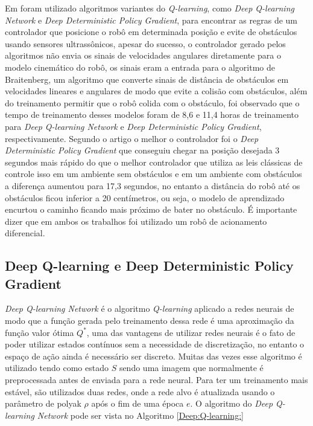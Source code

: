 Em \cite{quiroga2022position}
foram utilizado algoritmos variantes do \textit{Q-learning},
como \textit{Deep Q-learning Network} e \textit{Deep Deterministic Policy Gradient},
para encontrar as regras de um controlador que posicione o robô em determinada
posição e evite de obstáculos usando sensores ultrassônicos,
apesar do sucesso, o controlador gerado pelos algoritmos não envia
os sinais de velocidades angulares diretamente para o modelo cinemático
do robô, os sinais eram a entrada para o algoritmo de Braitenberg, um
algoritmo que converte sinais de distância de obstáculos em velocidades
lineares e angulares de modo que evite a colisão com obstáculos, além do treinamento permitir que o robô
colida com o obstáculo, foi observado que o tempo de treinamento desses modelos
foram de 8,6 e 11,4 horas de treinamento para \textit{Deep Q-learning Network}
e \textit{Deep Deterministic Policy Gradient}, respectivamente. Segundo o
artigo o melhor o controlador foi o \textit{Deep Deterministic Policy Gradient}
que conseguiu chegar na posição desejada 3 segundos mais rápido do que o
melhor controlador que utiliza as leis clássicas de controle isso em um ambiente sem
obstáculos e em um ambiente com obstáculos a diferença aumentou para
17,3 segundos, no entanto a distância do robô até os obstáculos ficou
inferior a 20 centímetros, ou seja, o modelo de aprendizado encurtou o
caminho ficando mais próximo de bater no obstáculo. É importante dizer que
em ambos os trabalhos foi utilizado um robô de acionamento diferencial.

\subsection{Deep Q-learning e Deep Deterministic Policy Gradient }
\textit{Deep Q-learning Network} é o algoritmo \textit{Q-learning}
aplicado a redes neurais de modo que a função gerada pelo treinamento
dessa rede é uma aproximação da função valor ótima $Q^*$, uma das vantagens
de utilizar redes neurais é o fato de poder utilizar estados contínuos sem a
necessidade de discretização, no entanto o espaço de ação ainda é necessário
ser discreto. Muitas das vezes esse algoritmo é utilizado
tendo como estado $S$ sendo uma imagem que normalmente é preprocessada
antes de enviada para a rede neural. Para ter um treinamento mais estável,
são utilizados duas redes, onde a rede alvo é atualizada usando o parâmetro
de polyak $\rho$ após o fim de uma época $e$.
O algoritmo do \textit{Deep Q-learning Network}
pode ser vista no Algoritmo \ref{Deep:Q-learning:}

